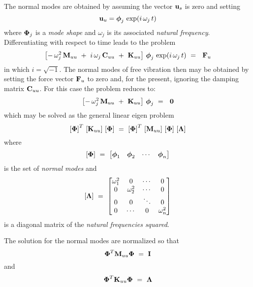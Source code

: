 The normal modes are obtained
by assuming the vector $\mathbf{u}_s$ is zero and setting
\begin{equation}
\label{eqm4}
\mathbf{u}_u = \boldsymbol{\phi}_j \,
\exp ( i \, \omega_j \, t )
\end{equation}
where $\boldsymbol{\Phi}_j$ is a {\it mode shape} and $\omega_j$ is its associated
{\it natural frequency}.
Differentiating with respect to time leads to the problem
\begin{equation}
\label{eqm6}
\left[
- \, \omega_j^2 \, \mathbf{M}_{uu} ~+~ i \, \omega_j \, \mathbf{C}_{uu} ~+~ \mathbf{K}_{uu}
\right] \,
\boldsymbol{\phi}_j \, \exp ( i \, \omega_j \, t ) ~=~ \ \mathbf{F}_u
\end{equation}
in which $i = \sqrt{-1}$.
The normal modes of free vibration then may be obtained by setting the force
vector $\mathbf{F}_u$ to zero and, for the present, ignoring the damping matrix
$\mathbf{C}_{uu}$.  For this case the problem reduces to:
\begin{equation}
\label{eqm7}
\left[
- \, \omega_j^2 \, \mathbf{M}_{uu} ~+~ \mathbf{K}_{uu} \right] \,
\boldsymbol{\phi}_j ~=~ \ \mathbf{0}
\end{equation}
which may be solved as the
general linear eigen problem
\begin{equation}
\label{eqm8}
\left[
\boldsymbol{\Phi} \right]^T \, \left[ \mathbf{K}_{uu} \right] \, \left[ \boldsymbol{\Phi}
\right] ~=~ \left[
\boldsymbol{\Phi} \right]^T \, \left[ \mathbf{M}_{uu} \right] \, \left[ \boldsymbol{\Phi}
\right] \, \left[ \boldsymbol{\Lambda} \right]
\end{equation}
where
\begin{equation}
\label{eqm9}
\left[
\boldsymbol{\Phi} \right]  ~=~
\left[ \begin{matrix}
\boldsymbol{\phi}_1 & \boldsymbol{\phi}_2 & \cdots & \boldsymbol{\phi}_n
\end{matrix} \right]
\end{equation}
is the set of {\it normal modes} and
\begin{equation}
\label{eqm10}
\left[
\boldsymbol{\Lambda} \right]  ~=~
\left[ \begin{matrix}
\omega_1^2 & 0 & \cdots & 0 \\
0 & \omega_2^2 & \cdots & 0 \\
0 & 0 & \ddots & 0 \\
0 & \cdots & 0 & \omega_n^2 \\
\end{matrix} \right]
\end{equation}
is a diagonal matrix of the {\it natural frequencies squared}.

The solution for the normal modes are normalized so that
\begin{equation}
\label{eqm11}
\boldsymbol{\Phi}^T \mathbf{M}_{uu} \boldsymbol{\Phi} ~=~ \mathbf{I}
\end{equation}
and
\begin{equation}
\label{eqm12}
\boldsymbol{\Phi}^T \mathbf{K}_{uu} \boldsymbol{\Phi} ~=~ \boldsymbol{\Lambda}
\end{equation}

